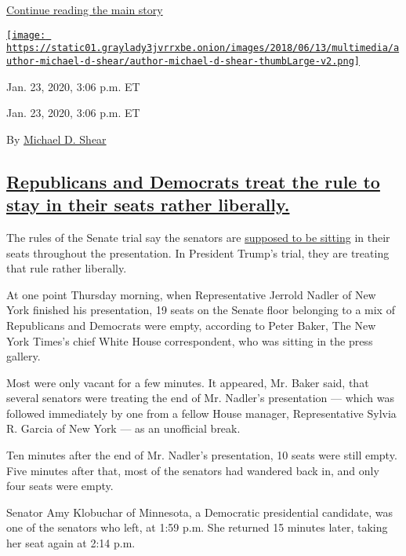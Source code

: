 \protect\hyperlink{after-dfp-ad-mid5}{Continue reading the main story}

\href{https://www.nytimes3xbfgragh.onion/by/michael-d-shear}{\texttt{[image: https://static01.graylady3jvrrxbe.onion/images/2018/06/13/multimedia/author-michael-d-shear/author-michael-d-shear-thumbLarge-v2.png]}}

Jan. 23, 2020, 3:06 p.m. ET

Jan. 23, 2020, 3:06 p.m. ET

By \href{https://www.nytimes3xbfgragh.onion/by/michael-d-shear}{Michael
D. Shear}

\hypertarget{republicans-and-democrats-treat-the-rule-to-stay-in-their-seats-rather-liberally}{%
\subsection{\texorpdfstring{\protect\hyperlink{republicans-and-democrats-treat-the-rule-to-stay-in-their-seats-rather-liberally}{Republicans
and Democrats treat the rule to stay in their seats rather
liberally.}}{Republicans and Democrats treat the rule to stay in their seats rather liberally.}}\label{republicans-and-democrats-treat-the-rule-to-stay-in-their-seats-rather-liberally}}

The rules of the Senate trial say the senators are
\href{https://www.nytimes3xbfgragh.onion/2020/01/21/us/politics/senate-impeachment.html}{supposed
to be sitting} in their seats throughout the presentation. In President
Trump's trial, they are treating that rule rather liberally.

At one point Thursday morning, when Representative Jerrold Nadler of New
York finished his presentation, 19 seats on the Senate floor belonging
to a mix of Republicans and Democrats were empty, according to Peter
Baker, The New York Times's chief White House correspondent, who was
sitting in the press gallery.

Most were only vacant for a few minutes. It appeared, Mr. Baker said,
that several senators were treating the end of Mr. Nadler's presentation
--- which was followed immediately by one from a fellow House manager,
Representative Sylvia R. Garcia of New York --- as an unofficial break.

Ten minutes after the end of Mr. Nadler's presentation, 10 seats were
still empty. Five minutes after that, most of the senators had wandered
back in, and only four seats were empty.

Senator Amy Klobuchar of Minnesota, a Democratic presidential candidate,
was one of the senators who left, at 1:59 p.m. She returned 15 minutes
later, taking her seat again at 2:14 p.m.

